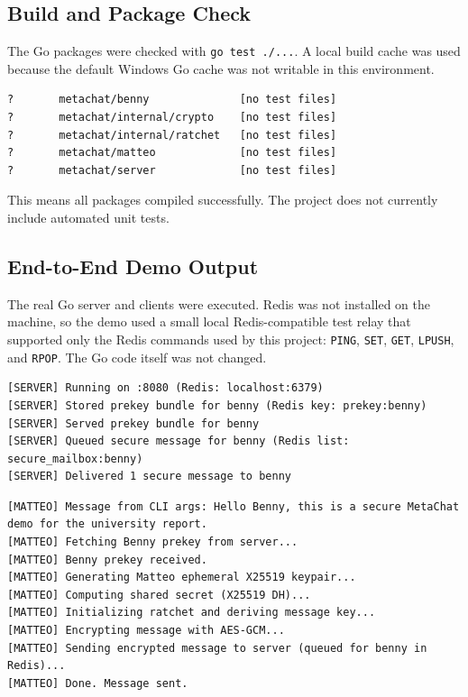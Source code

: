 \documentclass[12pt,a4paper]{article}
\begin{document}
\subsection{Build and Package Check}

The Go packages were checked with \texttt{go test ./...}. A local build cache was used because the default Windows Go cache was not writable in this environment.

\begin{lstlisting}[style=output, caption={Go package check output}]
?       metachat/benny              [no test files]
?       metachat/internal/crypto    [no test files]
?       metachat/internal/ratchet   [no test files]
?       metachat/matteo             [no test files]
?       metachat/server             [no test files]
\end{lstlisting}

This means all packages compiled successfully. The project does not currently include automated unit tests.

\subsection{End-to-End Demo Output}

The real Go server and clients were executed. Redis was not installed on the machine, so the demo used a small local Redis-compatible test relay that supported only the Redis commands used by this project: \texttt{PING}, \texttt{SET}, \texttt{GET}, \texttt{LPUSH}, and \texttt{RPOP}. The Go code itself was not changed.

\begin{lstlisting}[style=output, caption={Server output}]
[SERVER] Running on :8080 (Redis: localhost:6379)
[SERVER] Stored prekey bundle for benny (Redis key: prekey:benny)
[SERVER] Served prekey bundle for benny
[SERVER] Queued secure message for benny (Redis list: secure_mailbox:benny)
[SERVER] Delivered 1 secure message to benny
\end{lstlisting}

\begin{lstlisting}[style=output, caption={Matteo output}]
[MATTEO] Message from CLI args: Hello Benny, this is a secure MetaChat demo for the university report.
[MATTEO] Fetching Benny prekey from server...
[MATTEO] Benny prekey received.
[MATTEO] Generating Matteo ephemeral X25519 keypair...
[MATTEO] Computing shared secret (X25519 DH)...
[MATTEO] Initializing ratchet and deriving message key...
[MATTEO] Encrypting message with AES-GCM...
[MATTEO] Sending encrypted message to server (queued for benny in Redis)...
[MATTEO] Done. Message sent.
\end{lstlisting}
\end{document}
